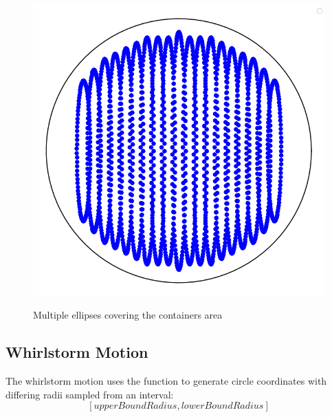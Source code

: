 \begin{figure}[H]
    \includegraphics[scale=0.35]{Graphics/motions/horizontal_elliptical.png}
    \centering
    \label{fig:foldingMotion1}
    \caption{Multiple ellipses covering the containers area}
\end{figure}


\subsection{Whirlstorm Motion}
The whirlstorm motion uses the function to generate circle coordinates  with differing radii sampled from an interval:
\[[upperBoundRadius, lowerBoundRadius]\]

